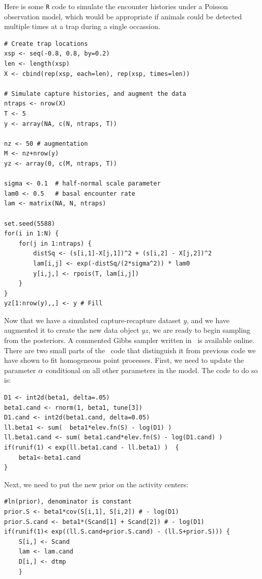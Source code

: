 Here is some \verb+R+ code to simulate the encounter histories under a
Poisson observation model, which would be appropriate if animals could
be detected multiple times at a trap during a single occassion.

\begin{small}
\begin{verbatim}
# Create trap locations
xsp <- seq(-0.8, 0.8, by=0.2)
len <- length(xsp)
X <- cbind(rep(xsp, each=len), rep(xsp, times=len))

# Simulate capture histories, and augment the data
ntraps <- nrow(X)
T <- 5
y <- array(NA, c(N, ntraps, T))

nz <- 50 # augmentation
M <- nz+nrow(y)
yz <- array(0, c(M, ntraps, T))

sigma <- 0.1  # half-normal scale parameter
lam0 <- 0.5   # basal encounter rate
lam <- matrix(NA, N, ntraps)

set.seed(5588)
for(i in 1:N) {
    for(j in 1:ntraps) {
        distSq <- (s[i,1]-X[j,1])^2 + (s[i,2] - X[j,2])^2
        lam[i,j] <- exp(-distSq/(2*sigma^2)) * lam0
        y[i,j,] <- rpois(T, lam[i,j])
    }
}
yz[1:nrow(y),,] <- y # Fill
\end{verbatim}
\end{small}

Now that we have a simulated capture-recapture dataset $y$, and we have
augmented it to create the new data object $yz$, we are ready to
begin sampling from the posteriors. A commented Gibbs sampler written
in \R~is available online. There are two small parts of the
\R~code that distinguish it from previous code we have shown to
fit homogeneous point processes. First, we need to update the parameter
${\bf \alpha}$ conditional on all other parameters in the model. The code to
do so is:

\begin{small}
\begin{verbatim}
D1 <- int2d(beta1, delta=.05)
beta1.cand <- rnorm(1, beta1, tune[3])
D1.cand <- int2d(beta1.cand, delta=0.05)
ll.beta1 <- sum(  beta1*elev.fn(S) - log(D1) )
ll.beta1.cand <- sum( beta1.cand*elev.fn(S) - log(D1.cand) )
if(runif(1) < exp(ll.beta1.cand - ll.beta1) )  {
    beta1<-beta1.cand
}
\end{verbatim}
\end{small}

Next, we need to put the new prior on the activity centers:

\begin{small}
\begin{verbatim}
#ln(prior), denominator is constant
prior.S <- beta1*cov(S[i,1], S[i,2]) # - log(D1)
prior.S.cand <- beta1*(Scand[1] + Scand[2]) # - log(D1)
if(runif(1)< exp((ll.S.cand+prior.S.cand) - (ll.S+prior.S))) {
    S[i,] <- Scand
    lam <- lam.cand
    D[i,] <- dtmp
    }
\end{verbatim}
\end{small}

